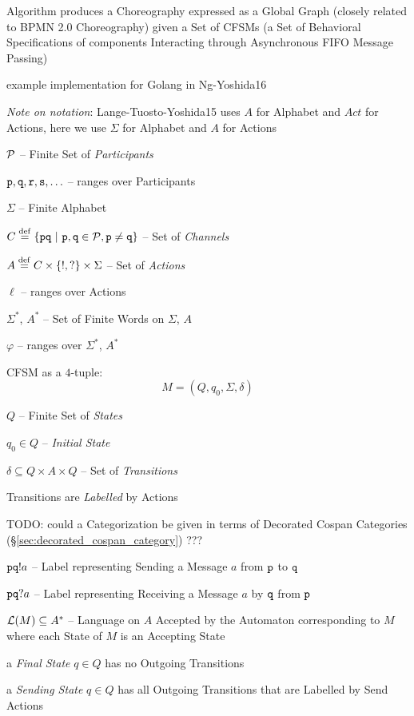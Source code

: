 Algorithm produces a Choreography expressed as a Global Graph (closely
related to BPMN 2.0 Choreography) given a Set of CFSMs (a Set of
Behavioral Specifications of components Interacting through
Asynchronous FIFO Message Passing)

example implementation for Golang in Ng-Yoshida16

\fist \emph{Note on notation}: Lange-Tuosto-Yoshida15 uses $A$ for
Alphabet and $Act$ for Actions, here we use $\Sigma$ for Alphabet and
$A$ for Actions

$\mathcal{P}$ -- Finite Set of \emph{Participants}

$\mathtt{p, q, r, s}, \ldots$ -- ranges over Participants

$\Sigma$ -- Finite Alphabet

$C \stackrel{\mathrm{def}}= \{ \mathtt{pq}
  \ |\ \mathtt{p,q} \in \mathcal{P}, \mathtt{p \neq q} \}$
-- Set of \emph{Channels}

$A \stackrel{\mathrm{def}}= C \times \{!,?\} \times \Sigma$ -- Set of \emph{Actions}

$\ell$ -- ranges over Actions

$\Sigma^*$, $A^*$ -- Set of Finite Words on $\Sigma$, $A$

$\varphi$ -- ranges over $\Sigma^*$, $A^*$

CFSM as a $4$-tuple:
\[
  M = (Q, q_0, \Sigma, \delta)
\]

$Q$ -- Finite Set of \emph{States}

$q_0 \in Q$ -- \emph{Initial State}

$\delta \subseteq Q \times A \times Q$ -- Set of \emph{Transitions}

Transitions are \emph{Labelled} by Actions

TODO: could a Categorization be given in terms of Decorated Cospan
Categories (\S\ref{sec:decorated_cospan_category}) ???

$\mathtt{pq}!a$ -- Label representing Sending a Message $a$ from
$\mathtt{p}$ to $\mathtt{q}$

$\mathtt{pq}?a$ -- Label representing Receiving a Message $a$ by
$\mathtt{q}$ from $\mathtt{p}$

$\mathcal{L}(M) \subseteq A^*$ -- Language on $A$ Accepted by the
Automaton corresponding to $M$ where each State of $M$ is an Accepting
State %

a \emph{Final State} $q \in Q$ has no Outgoing Transitions

a \emph{Sending State} $q \in Q$ has all Outgoing Transitions that are
Labelled by Send Actions

